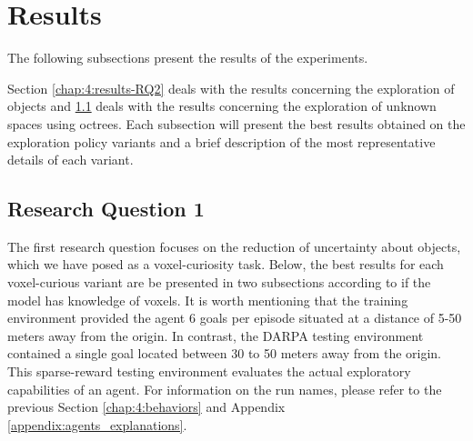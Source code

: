 \section{Results}\label{chap:4:results}
The following subsections present the results of the experiments. 

Section \ref{chap:4:results-RQ2} deals with the results concerning the exploration of objects and \ref{chap:4:results-RQ1} deals with the results concerning the exploration of unknown spaces using octrees. Each subsection will present the best results obtained on the exploration policy variants and a brief description of the most representative details of each variant.




\subsection{Research Question 1}\label{chap:4:results-RQ1}

The first research question focuses on the reduction of uncertainty about objects, which we have posed as a voxel-curiosity task. Below, the best results for each voxel-curious variant are be presented in two subsections according to if the model has knowledge of voxels. 
It is worth mentioning that the training environment provided the agent 6 goals per episode situated at a distance of 5-50 meters away from the origin. 
In contrast, the DARPA testing environment contained a single goal located between 30 to 50 meters away from the origin. This sparse-reward testing environment evaluates the actual exploratory capabilities of an agent.
For information on the run names, please refer to the previous Section \ref{chap:4:behaviors} and Appendix \ref{appendix:agents_explanations}.



